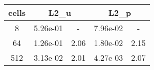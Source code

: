 \documentclass[10pt]{report}
\begin{document}
\begin{table}[H]
\begin{center}
\begin{tabular}{|c|c|c|c|c|} \hline
cells & 
\multicolumn{2}{|c|}{L2_u} & 
\multicolumn{2}{|c|}{L2_p}\\ \hline
8 & 5.26e-01 & - & 7.96e-02 & -\\ \hline
64 & 1.26e-01 & 2.06 & 1.80e-02 & 2.15\\ \hline
512 & 3.13e-02 & 2.01 & 4.27e-03 & 2.07\\ \hline
\end{tabular}
\end{center}
\end{table}
\end{document}

